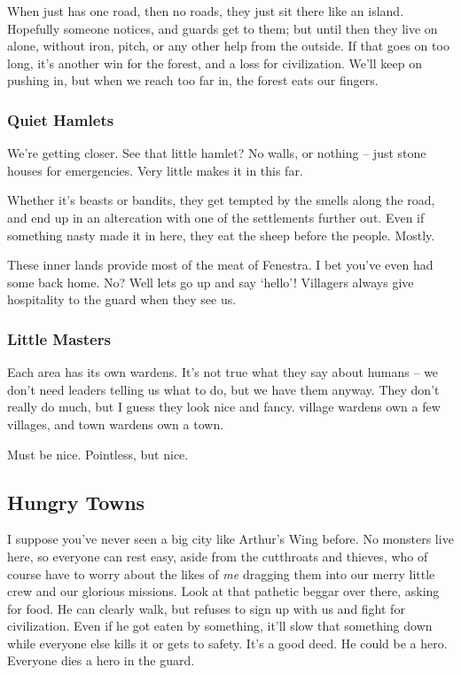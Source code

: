 \begin{multicols}{2}
\begin{exampletext}
  When  just has one road, then no roads, they just sit there like an island.
  Hopefully someone notices, and \glspl{guard} get to them; but until then they live on alone, without iron, pitch, or any other help from the outside.
  If that goes on too long, it's another win for the forest, and a loss for civilization.
  We'll keep on pushing in, but when we reach too far in, the forest eats our fingers.

  \subsubsection*{Quiet Hamlets}

  We're getting closer.
  See that little hamlet?
  No walls, or nothing -- just stone houses for emergencies.
  Very little makes it in this far.

  Whether it's beasts or bandits, they get tempted by the smells along the road, and end up in an altercation with one of the settlements further out.
  Even if something nasty made it in here, they eat the sheep before the people.
  Mostly.

  These inner lands provide most of the meat of Fenestra.
  I bet you've even had some back home.
  No?
  Well lets go up and say `hello'!
  Villagers always give hospitality to the \gls{guard} when they see us.

  \subsubsection*{Little Masters}

  Each area has its own \glspl{warden}.
  It's not true what they say about humans -- we don't need leaders telling us what to do, but we have them anyway.
  They don't really do much, but I guess they look nice and fancy.
  \Gls{village} \glspl{warden} own a few \glspl{village}, and town \glspl{warden} own a town.

  Must be nice.
  Pointless, but nice.
\end{exampletext}

\subsection*{Hungry Towns}

\begin{exampletext}

  I suppose you've never seen a big city like Arthur's Wing before.
  No monsters live here, so everyone can rest easy, aside from the cutthroats and thieves, who of course have to worry about the likes of \emph{me} dragging them into our merry little crew and our glorious missions.
  Look at that pathetic beggar over there, asking for food.
  He can clearly walk, but refuses to sign up with us and fight for civilization.
  Even if he got eaten by something, it'll slow that something down while everyone else kills it or gets to safety.
  It's a good deed.
  He could be a hero.
  Everyone dies a hero in the \gls{guard}.


\end{exampletext}
\end{multicols}
